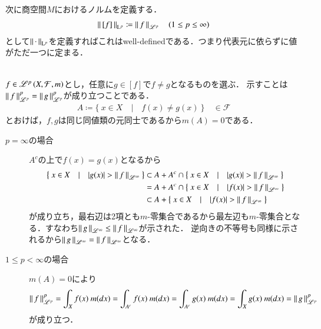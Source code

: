 \begin{qst}
次に商空間$M$におけるノルムを定義する．
\begin{align}
	\left\|\, [f]\, \right\|_{\mathrm{L}^p} \coloneqq \left\|\, f\, \right\|_{\mathscr{L}^p} \quad (1 \leq p \leq \infty)
\end{align}
として$\left\|\, \cdot\, \right\|_{\mathrm{L}^p}$を定義すればこれはwell-definedである．つまり代表元に依らずに値がただ一つに定まる．
\begin{bcs}\mbox{}\\
	$f \in \mathscr{L}^{p} \left(X,\mathcal{F},m\right)$とし，任意に$g \in [f]$で$f \neq g$となるものを選ぶ．
	示すことは$\left\|\, f\, \right\|_{\mathscr{L}^p}^p = \left\|\, g\, \right\|_{\mathscr{L}^p}^p$が成り立つことである．
	\begin{align}
		A \coloneqq \{\ x \in X\quad |\quad f(x) \neq g(x)\ \} \quad \in \mathcal{F}
	\end{align}
	とおけば，$f,g$は同じ同値類の元同士であるから$m(A)=0$である．
	\begin{description}
		\item[$p = \infty$の場合]
			$A^c$の上で$f(x)=g(x)$となるから
			\begin{align}
				\left\{\ x \in X\quad |\quad |g(x)| > \left\|\, f\, \right\|_{\mathscr{L}^\infty}\ \right\} 
				&\subset A + A^c \cap \left\{\ x \in X\quad |\quad |g(x)| > \left\|\, f\, \right\|_{\mathscr{L}^\infty}\ \right\} \\
				&= A + A^c \cap \left\{\ x \in X\quad |\quad |f(x)| > \left\|\, f\, \right\|_{\mathscr{L}^\infty}\ \right\} \\
				&\subset A + \left\{\ x \in X\quad |\quad |f(x)| > \left\|\, f\, \right\|_{\mathscr{L}^\infty}\ \right\}
			\end{align}
			が成り立ち，最右辺は2項とも$m$-零集合であるから最左辺も$m$-零集合となる．すなわち$\left\|\, g\, \right\|_{\mathscr{L}^\infty} \leq \left\|\, f\, \right\|_{\mathscr{L}^\infty}$が示された．
			逆向きの不等号も同様に示されるから$\left\|\, g\, \right\|_{\mathscr{L}^\infty} = \left\|\, f\, \right\|_{\mathscr{L}^\infty}$となる．
		\item[$1 \leq p < \infty$の場合]
			$m(A)=0$により
			\begin{align}
				\left\|\, f\, \right\|_{\mathscr{L}^p}^p = \int_X f(x)\ m(dx) = \int_{A^c} f(x)\ m(dx) = \int_{A^c} g(x)\ m(dx) = \int_X g(x)\ m(dx) = \left\|\, g\, \right\|_{\mathscr{L}^p}^p
			\end{align}
			が成り立つ．
	\end{description}
	\QED
\end{bcs}


\end{qst}
